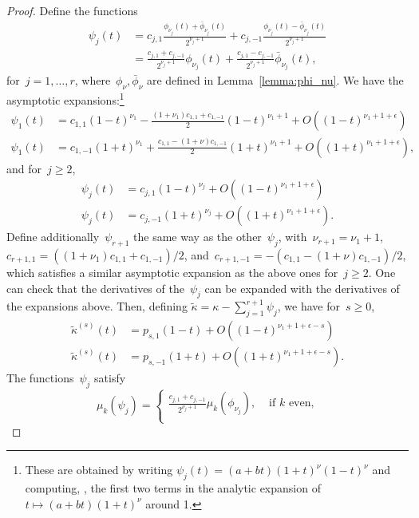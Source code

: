 \begin{proof}
Define the functions
\begin{align}
\psi_j(t) &= c_{j,1} \frac{\phi_{\nu_j}(t) + \bar \phi_{\nu_j}(t)}{2^{\nu_j + 1}} + c_{j,-1} \frac{\phi_{\nu_j}(t) - \bar \phi_{\nu_j}(t)}{2^{\nu_j + 1}} \label{eq:psij_def} \\
	&= \frac{c_{j,1} + c_{j,-1}}{2^{\nu_j + 1}} \phi_{\nu_j}(t) + \frac{c_{j,1} - c_{j,-1}}{2^{\nu_j + 1}} \bar \phi_{\nu_j}(t),
\end{align}
for~$j = 1, \ldots, r$, where~$\phi_{\nu}, \bar \phi_\nu$ are defined in Lemma~\ref{lemma:phi_nu}.
We have the asymptotic expansions:\footnote{These are obtained by writing $\psi_j(t) = (a + bt) (1 + t)^\nu (1 - t)^\nu$ and computing, \eg, the first two terms in the analytic expansion of~$t \mapsto (a + bt) (1 + t)^\nu$ around 1.}
\begin{align*}
\psi_1(t) &= c_{1,1} (1 - t)^{\nu_1} - \frac{(1 + \nu_1)c_{1,1} + c_{1,-1}}{2} (1 - t)^{\nu_1 + 1} + O((1 - t)^{\nu_1 + 1 + \epsilon}) \\
\psi_1(t) &= c_{1,-1} (1 + t)^{\nu_1} + \frac{c_{1,1} - (1 + \nu) c_{1,-1}}{2} (1 + t)^{\nu_1 + 1} + O((1 + t)^{\nu_1 + 1 + \epsilon}),
\end{align*}
and for~$j \geq 2$,
\begin{align*}
\psi_j(t) &= c_{j,1} (1 - t)^{\nu_j} + O((1 - t)^{\nu_1 + 1 + \epsilon}) \\
\psi_j(t) &= c_{j,-1} (1 + t)^{\nu_j} + O((1 + t)^{\nu_1 + 1 + \epsilon}).
\end{align*}
Define additionally~$\psi_{r+1}$ the same way as the other~$\psi_j$, with~$\nu_{r+1} = \nu_1 + 1$, $c_{r+1,1} = ((1 + \nu_1)c_{1,1} + c_{1,-1})/2$, and~$c_{r+1,-1} = -(c_{1,1} - (1 + \nu) c_{1,-1})/2$, which satisfies a similar asymptotic expansion as the above ones for~$j \geq 2$.
One can check that the derivatives of the~$\psi_j$ can be expanded with the derivatives of the expansions above.
Then, defining $\tilde \kappa = \kappa - \sum_{j=1}^{r+1} \psi_j$, we have for~$s \geq 0$,
\begin{align}
\tilde \kappa^{(s)}(t) &= p_{s,1}(1-t) + O((1-t)^{\nu_1 + 1 + \epsilon - s}) \\
\tilde \kappa^{(s)}(t) &= p_{s,-1}(1+t) + O((1+t)^{\nu_1 + 1 + \epsilon - s}).
\end{align}
The functions~$\psi_j$ satisfy
\begin{equation}
\mu_k(\psi_j) = \begin{cases}
	\frac{c_{j,1} + c_{j,-1}}{2^{\nu_j + 1}} \mu_k(\phi_{\nu_j}), &\text{ if $k$ even,}\\

\end{cases}
\end{equation}
\end{proof}
